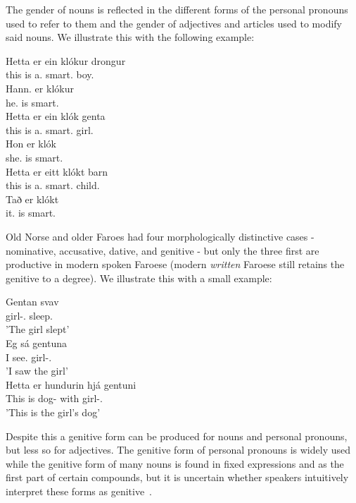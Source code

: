 \documentclass[12pt,%
]{lin-v2/lin}
\begin{document}
The gender of nouns is reflected in the different forms of the personal pronouns used to refer to them and the
gender of adjectives and articles used to modify said nouns. We illustrate this with the following example:
\begin{exe}
    \ex
    \gll Hetta er ein klókur drongur\\
    this is a.\M{} smart.\M{} boy.\M\\
    Hann. er klókur\\
    he.\M{} is smart.\M\\
    \gll Hetta er ein klók genta\\
    this is a.\F{} smart.\F{} girl.\F\\
    Hon er klók\\
    she.\F{} is smart.\F{}\\
    \gll Hetta er eitt klókt barn\\
    this is a.\N{} smart.\N{} child.\N\\
    Tað er klókt\\
    it.\N{} is smart.\N\\
\end{exe}

Old Norse and older Faroes had four morphologically distinctive cases - nominative, accusative, dative, and genitive -
but only the three first are productive in modern spoken Faroese (modern \emph{written} Faroese still retains the genitive
to a degree). We illustrate this with a small example:
\begin{exe}
    \ex
    \gll Gentan svav\\
    girl-\Det.\Nom{} sleep.\Pst\\
    \trans 'The girl slept'\\
    \gll Eg sá gentuna\\
    I see.\Pst{} girl-\Det.\Acc\\
    \trans 'I saw the girl'\\
    \gll Hetta er hundurin hjá gentuni\\
    This is dog-\Det{} with girl-\Det.\Dat\\
    \trans 'This is the girl'{}s dog'
\end{exe}

Despite this a genitive form can be produced for nouns and personal pronouns, but less so for adjectives. The genitive form
of personal pronouns is widely used while the genitive form of many nouns is found in fixed expressions and as the first
part of certain compounds, but it is uncertain whether speakers intuitively interpret these forms as genitive~\citep[62]{faroese}.
\end{document}
